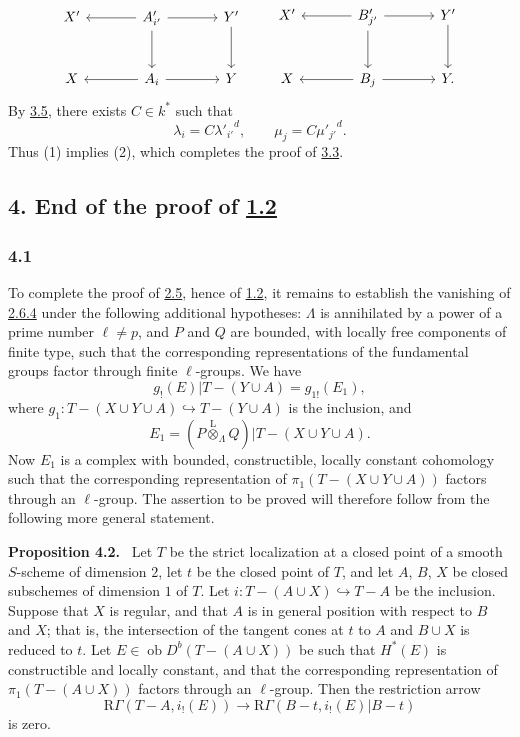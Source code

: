 \documentclass[11pt]{article}
\newenvironment{statement}[1]{\par\medskip\noindent\textbf{#1.}\ }{\par\medskip}
\providecommand{\lten}{\overset{\mathrm L}{\otimes}}
\providecommand{\Ob}{\operatorname{ob}}
\providecommand{\lten}{\overset{\mathrm L}{\otimes}}
\providecommand{\lten}{\overset{\mathrm L}{\otimes}}
\providecommand{\Ob}{\operatorname{ob}}
\providecommand{\lten}{\overset{\mathrm L}{\otimes}}
\providecommand{\lten}{\overset{\mathrm L}{\otimes}}
\providecommand{\Ob}{\operatorname{Ob}}
\providecommand{\lten}{\overset{\mathrm L}{\otimes}}
\providecommand{\Ob}{\operatorname{ob}}
\providecommand{\Ob}{\operatorname{Ob}}
\providecommand{\lten}{\overset{\mathrm L}{\otimes}}
\begin{document}
\[
\begin{tikzcd}[column sep=large,row sep=large]
X' & A'_{i'} \arrow[l] \arrow[r] \arrow[d] & Y' \arrow[d]\\
X & A_i \arrow[l] \arrow[r] & Y
\end{tikzcd}
\qquad
\begin{tikzcd}[column sep=large,row sep=large]
X' & B'_{j'} \arrow[l] \arrow[r] \arrow[d] & Y' \arrow[d]\\
X & B_j \arrow[l] \arrow[r] & Y .
\end{tikzcd}
\]
By \hyperref[sga5:IIIB:lemma:3.5]{3.5}, there exists $C\in k^*$ such that
\[
\lambda_i=C{\lambda'_{i'}}^d,\qquad
\mu_j=C{\mu'_{j'}}^d.
\]
Thus (1) implies (2), which completes the proof of \hyperref[sga5:IIIB:lemma:3.3]{3.3}.

\subsection*{4. End of the proof of \hyperref[sga5:IIIB:theorem:1.2]{1.2}}\label{sga5:IIIB:subsection:4}

\subsubsection*{4.1}\label{sga5:IIIB:subsubsection:4.1}
To complete the proof of \hyperref[sga5:IIIB:proposition:2.5]{2.5}, hence of \hyperref[sga5:IIIB:theorem:1.2]{1.2}, it remains to establish the vanishing of \hyperref[sga5:IIIB:equation:2.6.4]{2.6.4} under the following additional hypotheses: $\Lambda$ is annihilated by a power of a prime number $\ell\ne p$, and $P$ and $Q$ are bounded, with locally free components of finite type, such that the corresponding representations of the fundamental groups factor through finite $\ell$-groups. We have
\[
g_!(E)|T-(Y\cup A)=g_{1!}(E_1),
\]
where $g_1:T-(X\cup Y\cup A)\hookrightarrow T-(Y\cup A)$ is the inclusion, and
\[
E_1=(P\lten_{\Lambda}Q)|T-(X\cup Y\cup A).
\]
Now $E_1$ is a complex with bounded, constructible, locally constant cohomology such that the corresponding representation of $\pi_1(T-(X\cup Y\cup A))$ factors through an $\ell$-group. The assertion to be proved will therefore follow from the following more general statement.

\label{sga5:IIIB:proposition:4.2}\begin{statement}{Proposition 4.2}
Let $T$ be the strict localization at a closed point of a smooth $S$-scheme of dimension $2$, let $t$ be the closed point of $T$, and let $A$, $B$, $X$ be closed subschemes of dimension $1$ of $T$. Let $i:T-(A\cup X)\hookrightarrow T-A$ be the inclusion. Suppose that $X$ is regular, and that $A$ is in general position with respect to $B$ and $X$; that is, the intersection of the tangent cones at $t$ to $A$ and $B\cup X$ is reduced to $t$. Let $E\in\Ob D^b(T-(A\cup X))$ be such that $H^*(E)$ is constructible and locally constant, and that the corresponding representation of $\pi_1(T-(A\cup X))$ factors through an $\ell$-group. Then the restriction arrow
\[
\mathrm R\Gamma(T-A,i_!(E))
\longrightarrow
\mathrm R\Gamma(B-t,i_!(E)|B-t)
\]
is zero.
\end{statement}
\end{document}
